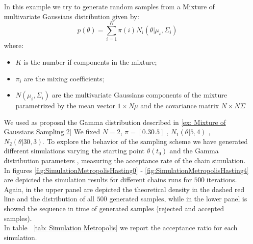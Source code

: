 \begin{example} \label{ex: Mixture of Multivariate Gaussians Sampling}
In this example we try to generate random samples from a Mixture of multivariate Gaussians distribution given by:
$$
	p(\theta)=\sum_{i=1}^K \pi(i)N_i(\theta | \mu_i,\Sigma_i)
$$
where:
\begin{itemize}
\item $K$ is the number if components in the mixture;
\item $\pi_i$ are the mixing coefficients;
\item $N(\mu_i,\Sigma_i)$ are the multivariate Gaussians components of the mixture 
parametrized by the mean vector $1 \times N \mu$ and the covariance matrix
$N \times N \Sigma$
\end{itemize}
We used as proposal the Gamma distribution described in \ref{ex: Mixture of Gaussians Sampling 2}
We fixed $N=2$, $\pi=[0.3 0.5]$ , $N_1(\theta |5,4)$ , $N_2(\theta |30,3)$.
To explore the behavior of the sampling scheme we have generated different simulations varying the starting point $\theta(t_0)$ and the Gamma distribution parameters , measuring the acceptance rate of the chain simulation.
%
In figures \ref{fig:SimulationMetropolisHasting0} - \ref{fig:SimulationMetropolisHasting4} are depicted the simulation results for different chains runs for $500$ iterations.
Again, in the upper panel are depicted the theoretical density in the dashed red line and the distribution of all $500$ generated samples, while in the lower panel is showed the sequence in time of generated samples (rejected and accepted samples).\\
In table ~\ref{tab: Simulation Metropolis} we report the acceptance ratio for each simulation.\\
%
\end{example}

